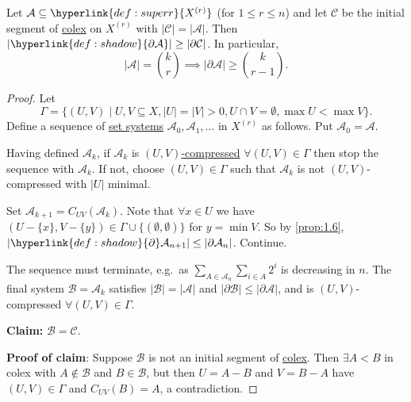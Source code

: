 \documentclass{article}
\let\subset\subseteq
\begin{document}
\begin{nthm}\label{thm:kk7}
  Let $\mathcal{A} \subset \hyperlink{def:superr}{X^{(r)}}$ (for $1 \leq r \leq n$) and let $\mathcal{C}$ be the initial segment of \hyperlink{def:colex}{colex} on $X^{(r)}$ with $|\mathcal{C}| = |\mathcal{A}|$.
  Then $|\hyperlink{def:shadow}{\partial \mathcal{A}}| \geq |\partial \mathcal{C}|$.
  In particular,
  \begin{equation*}|\mathcal{A}| = \binom{k}{r} \implies |\partial \mathcal{A}| \geq \binom{k}{r-1}.\end{equation*}
\end{nthm}
\begin{proof}
  Let
  \begin{equation*}
    \Gamma = \{(U,V) \mid U,V \subset X, |U| = |V| > 0, U \cap V = \emptyset, \max U < \max V\}.
  \end{equation*}
  Define a sequence of \hyperlink{def:ss}{set systems} $\mathcal{A}_0, \mathcal{A}_1, \dotsc$ in \hyperlink{def:superr}{$X^{(r)}$} as follows.
  Put $\mathcal{A}_0 = \mathcal{A}$.

  Having defined $\mathcal{A}_k$, if $\mathcal{A}_k$ is \hyperlink{def:uvcomp}{$(U,V)$-compressed} $\forall (U,V) \in \Gamma$ then stop the sequence with $\mathcal{A}_k$.
  If not, choose $(U,V) \in \Gamma$ such that $\mathcal{A}_k$ is not $(U,V)$-compressed with $|U|$ minimal.

  Set $\mathcal{A}_{k+1} = C_{UV}(\mathcal{A}_k)$.
  Note that $\forall x \in U$ we have $(U-\{x\}, V - \{y\}) \in \Gamma \cup \{(\emptyset,\emptyset)\}$ for $y = \min V$.
  So by \cref{prop:1.6}, $|\hyperlink{def:shadow}{\partial} \mathcal{A}_{n+1}| \leq |\partial \mathcal{A}_n|$.
  Continue.

  The sequence must terminate, e.g.\ as $\sum_{A \in \mathcal{A}_n} \sum_{i \in A} 2^i$ is decreasing in $n$.
  The final system $\mathcal{B} = \mathcal{A}_k$ satisfies $|\mathcal{B}| = |\mathcal{A}|$ and $|\partial \mathcal{B}| \leq |\partial \mathcal{A}|$, and is $(U,V)$-compressed $\forall (U,V) \in \Gamma$.

  \textbf{Claim:} $\mathcal{B} = \mathcal{C}$.

  \textbf{Proof of claim}: Suppose $\mathcal{B}$ is not an initial segment of \hyperlink{def:colex}{colex}.
  Then $\exists A < B$ in colex with $A \notin \mathcal{B}$ and $B \in \mathcal{B}$, but then $U = A-B$ and $V = B-A$ have $(U,V) \in \Gamma$ and $C_{UV}(B) = A$, a contradiction.
\end{proof}
\end{document}
